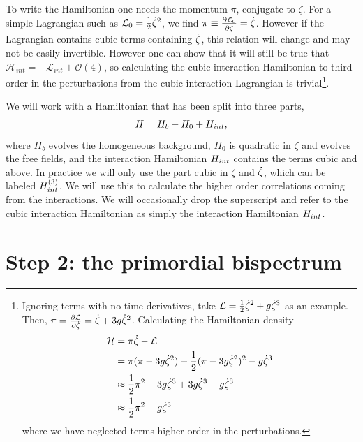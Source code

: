     To write the Hamiltonian one needs the momentum $\pi$, conjugate to $\zeta$.
    For a simple Lagrangian such as $\mathcal{L}_{0}=\frac{1}{2}\dot{\zeta}^2$,
    we find $\pi\equiv\frac{\partial \mathcal{L}_0}{\partial \dot{\zeta}}=\dot{\zeta}$. However if the Lagrangian contains cubic terms
    containing $\dot{\zeta}$, this relation will change and may not be easily invertible.
    However one can show that it will still be true that $\mathcal{H}_{int}=-\mathcal{L}_{int}+\mathcal{O}(4)$,
    so calculating the cubic interaction Hamiltonian to third order in the perturbations
    from the cubic interaction Lagrangian is trivial\footnote{
        Ignoring terms with no time derivatives, take $\mathcal{L}=\frac{1}{2}\dot{\zeta}^2+g\dot{\zeta}^3$
        as an example.
        Then, $\pi=\frac{\partial\mathcal{L}}{\partial \dot{\zeta}}=\dot{\zeta}+3g\dot{\zeta}^2$.
        Calculating the Hamiltonian density
        \begin{align}
            \mathcal{H} &= \pi\dot{\zeta} - \mathcal{L}\\
                    &= \pi(\pi-3g\dot{\zeta}^2) - \frac{1}{2}(\pi-3g\dot{\zeta}^2)^2-g\dot{\zeta}^3\\
                    &\approx \frac{1}{2}\pi^2-3g\dot{\zeta}^3 +3g\dot{\zeta}^3-g\dot{\zeta}^3\\
                    &\approx \frac{1}{2}\pi^2-g\dot{\zeta}^3
        \end{align}
        where we have neglected terms higher order in the perturbations.
    }.


    We will work with a Hamiltonian that has been split into three parts,
    \begin{align}
        H = H_b + H_0 + H_{int},
    \end{align}
    where $H_b$ evolves the homogeneous background, $H_0$ is quadratic in $\zeta$ and evolves the free
    fields, and the interaction Hamiltonian $H_{int}$ contains the terms cubic and above.
    In practice we will only use the part cubic in $\zeta$ and $\dot{\zeta}$,
    which can be labeled $H_{int}^{(3)}$. We will use this to calculate
    the higher order correlations coming from the interactions. We will occasionally drop the superscript and
    refer to the cubic interaction Hamiltonian as simply the interaction Hamiltonian $H_{int}$.


    \section{Step 2: the primordial bispectrum}\label{sec:inin_calc_example}
